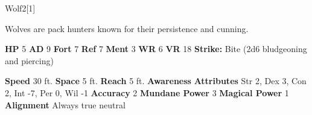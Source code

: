   
  \begin{monsection}{Wolf}{2}[1]
    \vspace{-1em}\vspace{-1em}
    \vspace{0em}

    
        Wolves are pack hunters known for their persistence and cunning.
      

    \begin{spellcontent}
      \begin{spelltargetinginfo}
        \pari \textbf{HP} 5 \monsep
          \textbf{AD} 9 \monsep
          \textbf{Fort} 7 \monsep
          \textbf{Ref} 7 \monsep
          \textbf{Ment} 3
        \pari \textbf{WR} 6 \monsep
        \textbf{VR} 18
        \pari \textbf{Strike:}
            Bite  (2d6 bludgeoning and piercing)
      \end{spelltargetinginfo}
    \end{spellcontent}
    \begin{monsterfooter}
      \pari \textbf{Speed} 30 ft. \monsep
        \textbf{Space} 5 ft. \monsep
        \textbf{Reach} 5 ft.
      \pari \textbf{Awareness} 
      \pari \textbf{Attributes}
        Str 2, Dex 3,
        Con 2, Int -7,
        Per 0, Wil -1
      \pari \textbf{Accuracy} 2 \monsep
        \textbf{Mundane Power} 3 \monsep
      \textbf{Magical Power} 1
      \pari \textbf{Alignment} Always true neutral
    \end{monsterfooter}
  \end{monsection}
  
